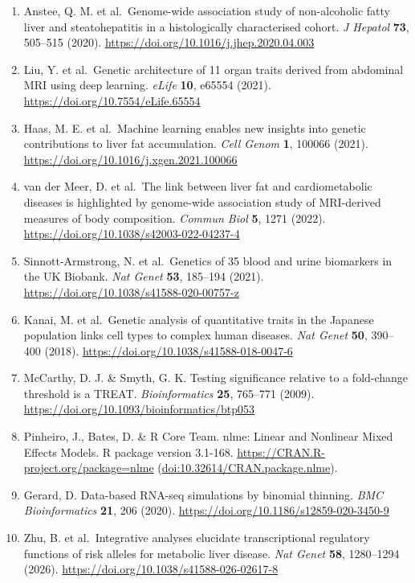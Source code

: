 \begin{enumerate}
  Namjou, B. et al.~GWAS and enrichment analyses of non-alcoholic fatty liver disease identify new trait-associated genes and pathways across eMERGE Network. \emph{BMC Med} \textbf{17}, 135 (2019). \url{https://doi.org/10.1186/s12916-019-1364-z}
\item
  Anstee, Q. M. et al.~Genome-wide association study of non-alcoholic fatty liver and steatohepatitis in a histologically characterised cohort. \emph{J Hepatol} \textbf{73}, 505--515 (2020). \url{https://doi.org/10.1016/j.jhep.2020.04.003}
\item
  Liu, Y. et al.~Genetic architecture of 11 organ traits derived from abdominal MRI using deep learning. \emph{eLife} \textbf{10}, e65554 (2021). \url{https://doi.org/10.7554/eLife.65554}
\item
  Haas, M. E. et al.~Machine learning enables new insights into genetic contributions to liver fat accumulation. \emph{Cell Genom} \textbf{1}, 100066 (2021). \url{https://doi.org/10.1016/j.xgen.2021.100066}
\item
  van der Meer, D. et al.~The link between liver fat and cardiometabolic diseases is highlighted by genome-wide association study of MRI-derived measures of body composition. \emph{Commun Biol} \textbf{5}, 1271 (2022). \url{https://doi.org/10.1038/s42003-022-04237-4}
\item
  Sinnott-Armstrong, N. et al.~Genetics of 35 blood and urine biomarkers in the UK Biobank. \emph{Nat Genet} \textbf{53}, 185--194 (2021). \url{https://doi.org/10.1038/s41588-020-00757-z}
\item
  Kanai, M. et al.~Genetic analysis of quantitative traits in the Japanese population links cell types to complex human diseases. \emph{Nat Genet} \textbf{50}, 390--400 (2018). \url{https://doi.org/10.1038/s41588-018-0047-6}
\item
  McCarthy, D. J. \& Smyth, G. K. Testing significance relative to a fold-change threshold is a TREAT. \emph{Bioinformatics} \textbf{25}, 765--771 (2009). \url{https://doi.org/10.1093/bioinformatics/btp053}
\item
  Pinheiro, J., Bates, D. \& R Core Team. nlme: Linear and Nonlinear Mixed Effects Models. R package version 3.1-168. \url{https://CRAN.R-project.org/package=nlme} (\url{doi:10.32614/CRAN.package.nlme}).
\item
  Gerard, D. Data-based RNA-seq simulations by binomial thinning. \emph{BMC Bioinformatics} \textbf{21}, 206 (2020). \url{https://doi.org/10.1186/s12859-020-3450-9}
\item
  Zhu, B. et al.~Integrative analyses elucidate transcriptional regulatory functions of risk alleles for metabolic liver disease. \emph{Nat Genet} \textbf{58}, 1280--1294 (2026). \url{https://doi.org/10.1038/s41588-026-02617-8}

\end{enumerate}
